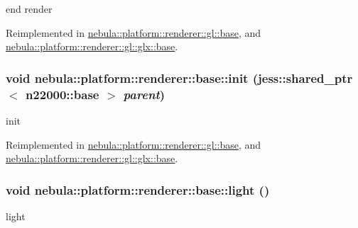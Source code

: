 end render 

Reimplemented in \hyperlink{classnebula_1_1platform_1_1renderer_1_1gl_1_1base_ae07ce667896249b4b60e800a985f0721}{nebula::platform::renderer::gl::base}, and \hyperlink{classnebula_1_1platform_1_1renderer_1_1gl_1_1glx_1_1base_aaf176ccae80229814c17536d2c9aa24e}{nebula::platform::renderer::gl::glx::base}.\hypertarget{classnebula_1_1platform_1_1renderer_1_1base_aa7d53dc81000acba49cc90519674f909}{
\subsubsection[{init}]{\setlength{\rightskip}{0pt plus 5cm}void nebula::platform::renderer::base::init (jess::shared\_\-ptr$<$ {\bf n22000::base} $>$ {\em parent})}}
\label{classnebula_1_1platform_1_1renderer_1_1base_aa7d53dc81000acba49cc90519674f909}


init 

Reimplemented in \hyperlink{classnebula_1_1platform_1_1renderer_1_1gl_1_1base_affa88173c0ac23d9245a9addd721488b}{nebula::platform::renderer::gl::base}, and \hyperlink{classnebula_1_1platform_1_1renderer_1_1gl_1_1glx_1_1base_a08357ff32222b7e316db783de5755a2e}{nebula::platform::renderer::gl::glx::base}.\hypertarget{classnebula_1_1platform_1_1renderer_1_1base_af5a83a10b4c0b04997997f3337b49bd6}{
\subsubsection[{light}]{\setlength{\rightskip}{0pt plus 5cm}void nebula::platform::renderer::base::light ()}}
\label{classnebula_1_1platform_1_1renderer_1_1base_af5a83a10b4c0b04997997f3337b49bd6}


light 

